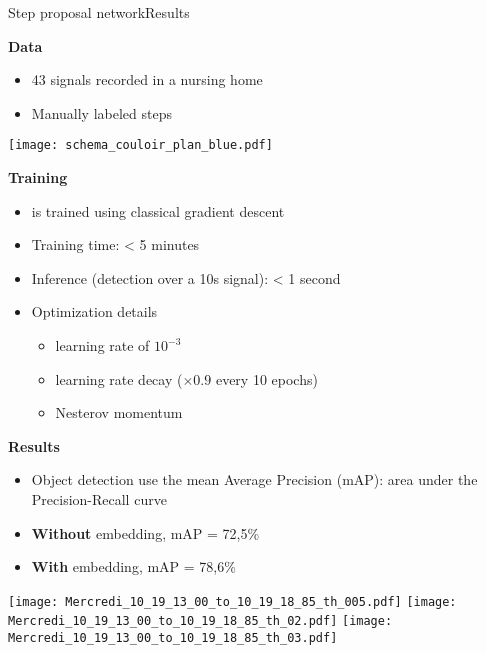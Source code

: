 \begin{frame}{Step proposal network}{Results}
\begin{minipage}[t]{0.48\linewidth}
    \vspace{0pt}
    \centering\textbf{Data}
    \begin{itemize}
        \item 43 signals recorded in a nursing home
        \item Manually labeled steps
    \end{itemize}
    \texttt{[image: schema\_couloir\_plan\_blue.pdf]}

    \pause
    \centering\textbf{Training}
    \begin{itemize}
        \item \subalgo is trained using classical gradient descent
        \item Training time: < 5 minutes
        \item Inference (detection over a 10s signal): < 1 second
        \item Optimization details
        \begin{itemize}
            \item learning rate of $10^{-3}$
            \item learning rate decay ($\times 0.9$ every 10 epochs)
            \item Nesterov momentum
        \end{itemize}
    \end{itemize}
\end{minipage}\hfill
\begin{minipage}[t]{0.51\linewidth}
    \vspace{0pt}
    \pause
    \centering\textbf{Results}
    \begin{itemize}
        \item Object detection use the mean Average Precision (mAP): area under the Precision-Recall curve
        \item \textbf{Without} embedding, mAP = 72,5\%
        \item \textbf{With} embedding, mAP = 78,6\%
    \end{itemize}
\pause
\vspace{-0.1cm}
\renewcommand{\ratio}{1.00}
    \begin{overprint}
        \onslide<+>\centering\texttt{[image: Mercredi\_10\_19\_13\_00\_to\_10\_19\_18\_85\_th\_005.pdf]}
        \onslide<+>\centering\texttt{[image: Mercredi\_10\_19\_13\_00\_to\_10\_19\_18\_85\_th\_02.pdf]}
        \onslide<+->\centering\texttt{[image: Mercredi\_10\_19\_13\_00\_to\_10\_19\_18\_85\_th\_03.pdf]}
    \end{overprint}
\end{minipage}
\end{frame}


